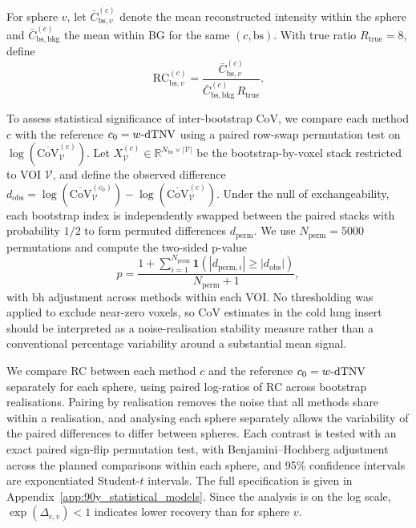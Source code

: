 For sphere $v$, let $\bar{C}^{(c)}_{\mathrm{bs},v}$ denote the mean reconstructed intensity within the sphere and $\bar{C}^{(c)}_{\mathrm{bs},\mathrm{bkg}}$ the mean within BG for the same $(c,\mathrm{bs})$. With true ratio $R_{\mathrm{true}}=8$, define
\begin{equation}
\mathrm{RC}^{(c)}_{\mathrm{bs},v} = \frac{\bar{C}^{(c)}_{\mathrm{bs},v}}{\bar{C}^{(c)}_{\mathrm{bs},\mathrm{bkg}}\,R_{\mathrm{true}}}.
\end{equation}

To assess statistical significance of inter-bootstrap CoV, we compare each method $c$ with the reference $c_0=w\text{-}\mathrm{dTNV}$ using a paired row-swap permutation test on $\log(\overline{\mathrm{CoV}}^{(c)}_{\mathcal{V}})$. Let $X^{(c)}_{\mathcal{V}}\in\mathbb{R}^{N_{\mathrm{bs}}\times|\mathcal{V}|}$ be the bootstrap-by-voxel stack restricted to VOI $\mathcal{V}$, and define the observed difference $d_{\mathrm{obs}}=\log(\overline{\mathrm{CoV}}^{(c_0)}_{\mathcal{V}})-\log(\overline{\mathrm{CoV}}^{(c)}_{\mathcal{V}})$. Under the null of exchangeability, each bootstrap index is independently swapped between the paired stacks with probability $1/2$ to form permuted differences $d_{\mathrm{perm}}$. We use $N_{\mathrm{perm}}=5000$ permutations and compute the two-sided p-value
\begin{equation}
p =
\frac{1+\sum_{i=1}^{N_{\mathrm{perm}}}\mathbf{1}\!\left(|d_{\mathrm{perm},i}|\ge |d_{\mathrm{obs}}|\right)}
{N_{\mathrm{perm}}+1},
\end{equation}
with \acrfull{bh} adjustment across methods within each VOI\@. No thresholding was applied to exclude near-zero voxels, so CoV estimates in the cold lung insert should be interpreted as a noise-realisation stability measure rather than a conventional percentage variability around a substantial mean signal.

We compare RC between each method $c$ and the reference $c_0=w\text{-}\mathrm{dTNV}$ separately for each sphere, using paired log-ratios of RC across bootstrap realisations. Pairing by realisation removes the noise that all methods share within a realisation, and analysing each sphere separately allows the variability of the paired differences to differ between spheres. Each contrast is tested with an exact paired sign-flip permutation test, with Benjamini--Hochberg adjustment across the planned comparisons within each sphere, and 95\% confidence intervals are exponentiated Student-$t$ intervals. The full specification is given in Appendix~\ref{app:90y_statistical_models}. Since the analysis is on the log scale, $\exp(\Delta_{c,v})<1$ indicates lower recovery than \wdtnv for sphere $v$.


